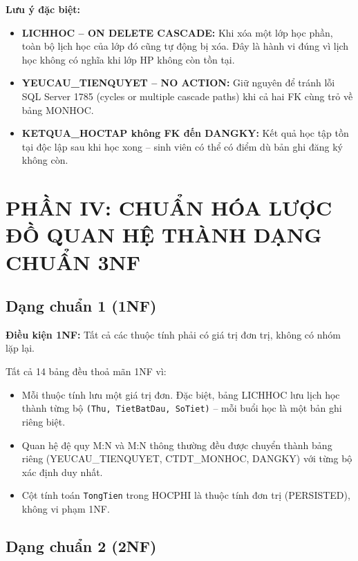 \documentclass[13pt, a4paper]{article}
\begin{document}
\noindent \textbf{Lưu ý đặc biệt:}
\begin{itemize}[leftmargin=1.5cm]
  \item \textbf{LICHHOC -- ON DELETE CASCADE:} Khi xóa một lớp học phần, toàn bộ lịch học của lớp đó cũng tự động bị xóa. Đây là hành vi đúng vì lịch học không có nghĩa khi lớp HP không còn tồn tại.
  \item \textbf{YEUCAU\_TIENQUYET -- NO ACTION:} Giữ nguyên để tránh lỗi SQL Server 1785 (cycles or multiple cascade paths) khi cả hai FK cùng trỏ về bảng MONHOC.
  \item \textbf{KETQUA\_HOCTAP không FK đến DANGKY:} Kết quả học tập tồn tại độc lập sau khi học xong -- sinh viên có thể có điểm dù bản ghi đăng ký không còn.
\end{itemize}

\newpage
\section{PHẦN IV: CHUẨN HÓA LƯỢC ĐỒ QUAN HỆ THÀNH DẠNG CHUẨN 3NF}

\subsection{Dạng chuẩn 1 (1NF)}

\noindent \textbf{Điều kiện 1NF:} Tất cả các thuộc tính phải có giá trị đơn trị, không có nhóm lặp lại.

\noindent Tất cả 14 bảng đều thoả mãn 1NF vì:
\begin{itemize}[leftmargin=1.5cm]
  \item Mỗi thuộc tính lưu một giá trị đơn. Đặc biệt, bảng LICHHOC lưu lịch học thành từng bộ \texttt{(Thu, TietBatDau, SoTiet)} -- mỗi buổi học là một bản ghi riêng biệt.
  \item Quan hệ đệ quy M:N và M:N thông thường đều được chuyển thành bảng riêng (YEUCAU\_TIENQUYET, CTDT\_MONHOC, DANGKY) với từng bộ xác định duy nhất.
  \item Cột tính toán \texttt{TongTien} trong HOCPHI là thuộc tính đơn trị (PERSISTED), không vi phạm 1NF.
\end{itemize}

\subsection{Dạng chuẩn 2 (2NF)}
\end{document}
